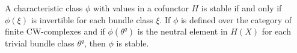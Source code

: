 A characteristic class $\phi$ with values in a cofunctor $H$ is stable if and only if $\phi(\xi)$ is invertible for each bundle class $\xi$. If $\phi$ is defined over the category of finite CW-complexes and if $\phi(\theta^q)$ is the neutral element in $H(X)$ for each trivial bundle class $\theta^q$, then $\phi$ is stable.
